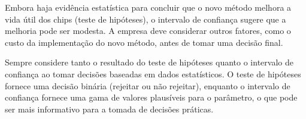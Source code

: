 \documentclass[a4paper,12pt]{article}
\begin{document}
Embora haja evidência estatística para concluir que o novo método melhora a vida útil dos chips (teste de hipóteses), o intervalo de confiança sugere que a melhoria pode ser modesta. A empresa deve considerar outros fatores, como o custo da implementação do novo método, antes de tomar uma decisão final.

\begin{tcolorbox}[colback=green!5, colframe=green!40, title=\textbf{Dica de Interpretação}]
Sempre considere tanto o resultado do teste de hipóteses quanto o intervalo de confiança ao tomar decisões baseadas em dados estatísticos. O teste de hipóteses fornece uma decisão binária (rejeitar ou não rejeitar), enquanto o intervalo de confiança fornece uma gama de valores plausíveis para o parâmetro, o que pode ser mais informativo para a tomada de decisões práticas.
\end{tcolorbox}
\end{document}
